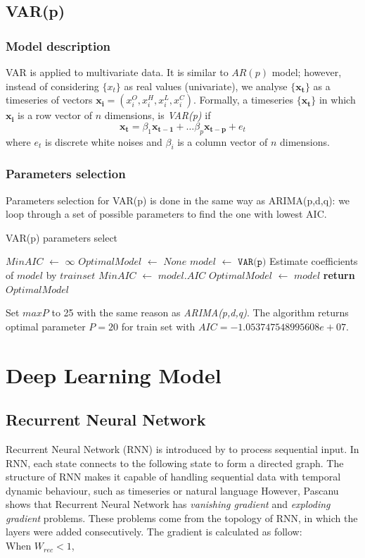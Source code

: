 \documentclass[11pt]{article}
\begin{document}
\subsection{VAR(p)}
\subsubsection{Model description}
VAR is applied to multivariate data. It is similar to $AR(p)$ model; however,
instead of considering $\{x_t\}$ as real values (univariate), we analyse
$\{\mathbf{x_t}\}$ as a timeseries of vectors $\mathbf{x_i}=(x_i^O, x_i^H, x_i^L, x_i^C)$. 
Formally, a timeseries $\{\mathbf{x_t}\}$ in which $\mathbf{x_i}$ is a row
vector of $n$ dimensions, is \textit{VAR(p)} if
$$
\mathbf{x_t}=\beta_1\mathbf{x_{t-1}} + \ldots \beta_p\mathbf{x_{t-p}} + e_t
$$
where $e_t$ is discrete white noises and $\beta_i$ is a column vector of $n$ dimensions.
\subsubsection{Parameters selection}
Parameters selection for VAR(p) is done in the same way as ARIMA(p,d,q): we loop
through a set of possible parameters to find the one with lowest AIC.
\begin{algorithm}[H]
\caption{VAR(p) parameters select}\label{paramsselect2}
\begin{algorithmic}[1]
  \State $MinAIC$ $\gets$ $\infty$
  \State $OptimalModel$ $\gets$ $None$
  \State $model$ $\gets$ $\texttt{VAR(p)}$
  \State Estimate coefficients of $model$ by $trainset$
  \State $MinAIC$ $\gets$ $model.AIC$
  \State $OptimalModel$ $\gets$ $model$
  \EndIf
  \EndFor
  \State \textbf{return} $OptimalModel$
\EndProcedure
\end{algorithmic}
\end{algorithm}
Set $maxP$ to 25 with the same reason as \textit{ARIMA(p,d,q)}. The algorithm
returns optimal parameter $P=20$ for train set with
$AIC=-1.053747548995608e+07$. 



\section{Deep Learning Model}
\subsection{Recurrent Neural Network}
Recurrent Neural Network (RNN) is introduced by \cite{rumelhart1988learning} to
process sequential input. In RNN, each state connects to the following state
to form a directed graph. The structure of RNN makes it capable of handling
sequential data with temporal dynamic behaviour, such as timeseries or natural
language 
However, Pascanu \cite{pascanu2013difficulty} shows that Recurrent Neural
Network has \textit{vanishing gradient} and \textit{exploding gradient}
problems. These problems come from the topology of RNN, in which the layers were
added consecutively. The gradient is calculated as follow:
$$
$$
When $W_{rec}<1$,  
\end{document}
